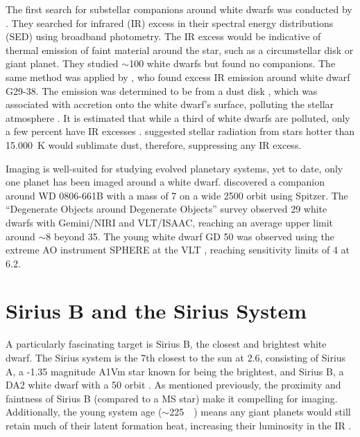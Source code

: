 \documentclass[twocolumn,linenumbers]{aastex631}
\begin{document}
The first search for substellar companions around white dwarfs was conducted by \citet{probst_infrared_1983}. They searched for infrared (IR) excess in their spectral energy distributions (SED) using broadband photometry. The IR excess would be indicative of thermal emission of faint material around the star, such as a circumstellar disk or giant planet. They studied $\sim$100 white dwarfs but found no companions. The same method was applied by \citet{zuckerman_excess_1987}, who found excess IR emission around white dwarf G29-38. The emission was determined to be from a dust disk \citep{telesco_observations_1990}, which was associated with accretion onto the white dwarf's surface, polluting the stellar atmosphere \citep{koester_metals_1997}. It is estimated that while a third of white dwarfs are polluted, only a few percent have IR excesses \citep{bonsor_pollution_2015}. \citet{skemer_sirius_2011} suggested stellar radiation from stars hotter than \qty{15,000}{\kelvin} would sublimate dust, therefore, suppressing any IR excess.

Imaging is well-suited for studying evolved planetary systems, yet to date, only one planet has been imaged around a white dwarf. \citet{luhman_discovery_2011} discovered a companion around WD 0806-661B with a mass of \qty{7}{\jupitermass} on a wide \qty{2500}{\au} orbit using Spitzer. The ``Degenerate Objects around Degenerate Objects'' survey \citep[DODO;][]{hogan_dodo_2009} observed 29 white dwarfs with Gemini/NIRI and VLT/ISAAC, reaching an average upper limit around $\sim$\qty{8}{\jupitermass} beyond \qty{35}{\au}. The young white dwarf GD 50 was observed using the extreme AO instrument SPHERE at the VLT \citep{xu_extreme-ao_2015}, reaching sensitivity limits of \qty{4}{\jupitermass} at \qty{6.2}{\au}.

\section{Sirius B and the Sirius System}

A particularly fascinating target is Sirius B, the closest and brightest white dwarf. The Sirius system is the 7th closest to the sun at \qty{2.6}{\parsec}, consisting of Sirius A, a -1.35 magnitude A1Vm star known for being the brightest, and Sirius B, a DA2 white dwarf with a \qty{50}{\year} orbit \citep{bond_sirius_2017,gaia_collaboration_gaia_2018}. As mentioned previously, the proximity and faintness of Sirius B (compared to a MS star) make it compelling for imaging. Additionally, the young system age ($\sim$\qty{225}{\mega\year}) means any giant planets would still retain much of their latent formation heat, increasing their luminosity in the IR \citep{fortney_giant_2010}.
\end{document}

